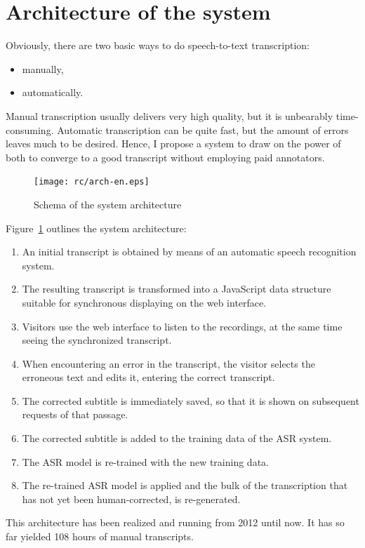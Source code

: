 \documentclass[12pt,a4paper]{report}
\begin{document}
\section{Architecture of the system}

Obviously, there are two basic ways to do speech-to-text transcription:
\begin{itemize}
\item{manually,}
\item{automatically.}
\end{itemize}
Manual transcription usually delivers very high quality, but it is unbearably
time-consuming. Automatic transcription can be quite fast, but the amount of
errors leaves much to be desired. Hence, I propose a system
to draw on the power of both to converge to a good transcript without employing
paid annotators.

\begin{figure}[htpb]
\texttt{[image: rc/arch-en.eps]}
\caption{Schema of the system architecture}
\label{fig:arch}
\end{figure}

Figure~\ref{fig:arch} outlines the system architecture:
\begin{enumerate}
\item{An initial transcript is obtained by means of an automatic speech recognition
system.\label{enum:arch:init}}
\item{The resulting transcript is transformed into a JavaScript data
structure suitable for synchronous displaying on the web
interface.\label{enum:arch:htk2sub}}
\item{Visitors use the web interface to listen to the recordings,
at the same time seeing the synchronized transcript.}
\item{When encountering an error in the transcript, the visitor selects the
erroneous text and edits it, entering the correct transcript.}
\item{The corrected subtitle is immediately saved, so that it is shown on
subsequent requests of that passage.}
\item{The corrected subtitle is added to the training data of the ASR system.}
\item{The ASR model is re-trained with the new training data.}
\item{The re-trained ASR model is applied and the bulk of the transcription that
has not yet been human-corrected, is re-generated.}
\end{enumerate}

This architecture has been realized and running from 2012 until now. It has so
far yielded 108 hours of manual transcripts.
\end{document}
